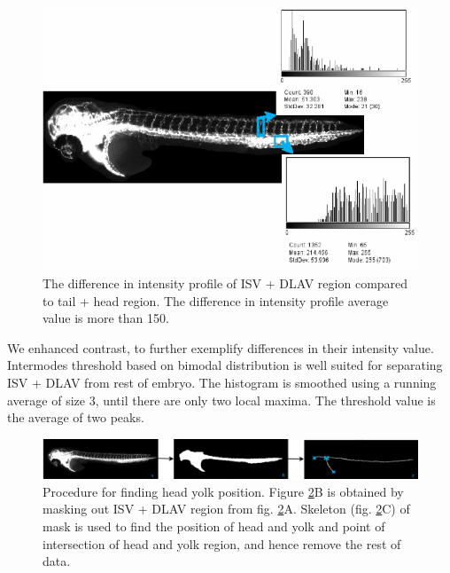 \begin{figure}[htb] 
 \centering
    \includegraphics[scale=0.3]{figure/intensityProfile.png}
  \caption[Intensity profile of ISV + DLAV region compared to tail + head region]{The difference in intensity profile of ISV + DLAV region compared to tail + head region. The difference in intensity profile average value is more than 150.}
  \label{intensityProfile}
\end{figure}

We enhanced contrast, to further exemplify differences in their intensity value. Intermodes threshold based on bimodal distribution is well suited for separating ISV + DLAV from rest of embryo. The histogram is smoothed using a running average of size 3, until there are only two local maxima. The threshold value is the average of two peaks. 

\begin{figure}[htb] 
 \centering
    \includegraphics[scale=0.25]{figure/headYolkPosition.png}
  \caption[Procedure for finding head yolk position]{ Procedure for finding head yolk position. Figure \ref{noiseRem}B is obtained by masking out ISV + DLAV region from fig. \ref{noiseRem}A. Skeleton (fig. \ref{noiseRem}C) of mask is used to find the position of head and yolk and point of intersection of head and yolk region, and hence remove the rest of data.}
  \label{noiseRem}
\end{figure}

